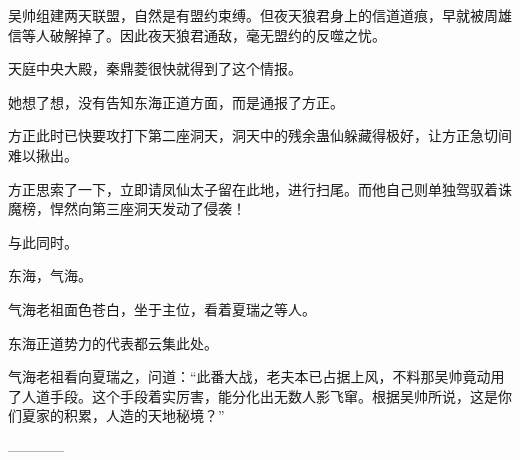 \begin{this_body}
吴帅组建两天联盟，自然是有盟约束缚。但夜天狼君身上的信道道痕，早就被周雄信等人破解掉了。因此夜天狼君通敌，毫无盟约的反噬之忧。

天庭中央大殿，秦鼎菱很快就得到了这个情报。

她想了想，没有告知东海正道方面，而是通报了方正。

方正此时已快要攻打下第二座洞天，洞天中的残余蛊仙躲藏得极好，让方正急切间难以揪出。

方正思索了一下，立即请凤仙太子留在此地，进行扫尾。而他自己则单独驾驭着诛魔榜，悍然向第三座洞天发动了侵袭！

与此同时。

东海，气海。

气海老祖面色苍白，坐于主位，看着夏瑞之等人。

东海正道势力的代表都云集此处。

气海老祖看向夏瑞之，问道：“此番大战，老夫本已占据上风，不料那吴帅竟动用了人道手段。这个手段着实厉害，能分化出无数人影飞窜。根据吴帅所说，这是你们夏家的积累，人造的天地秘境？”

------------

\end{this_body}

